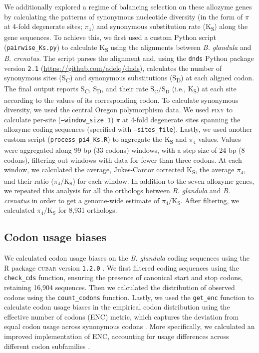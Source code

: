 \documentclass[11pt]{article}
\newcommand{\bgla}{\textit{B. glandula}\xspace}
\newcommand{\Ks}{K\textsubscript{S}\xspace}
\begin{document}
We additionally explored a regime of balancing selection on these allozyme genes by
calculating the patterns of synonymous nucleotide diversity (in the form of $\pi$ at
4-fold degenerate sites; $\pi_{4}$) and synonymous substitution rate (\Ks{}) along
the gene sequences.
To achieve this, we first used a custom Python script (\texttt{pairwise\_Ks.py}) to
calculate \Ks{} using the alignments between \bgla{} and \textit{B. crenatus}.
The script parses the alignment and, using the \texttt{dnds} Python package version
\texttt{2.1} (\url{https://github.com/adelq/dnds}), calculates the number of
synonymous sites (S\textsubscript{C}) and synonymous substitutions
(S\textsubscript{D}) at each aligned codon.
The final output reports S\textsubscript{C}, S\textsubscript{D}, and their rate
$\text{S}_\text{C}/\text{S}_\text{D}$ (i.e., \Ks{}) at each site according to the
values of its corresponding codon.
To calculate synonymous diversity, we used the central Oregon polymorphism data.
We used \textsc{pixy} to calculate per-site (\texttt{--window\_size 1}) $\pi$ at
4-fold degenerate sites spanning the allozyme coding sequences (specified with
\texttt{--sites\_file}).
Lastly, we used another custom script (\texttt{process\_pi4\_Ks.R}) to aggregate
the \Ks{} and $\pi_{4}$ values.
Values were aggregated along 99 bp (33 codons) windows, with a step size of 24 bp
(8 codons), filtering out windows with data for fewer than three codons.
At each window, we calculated the average, Jukes-Cantor corrected \Ks{}, the
average $\pi_{4}$, and their ratio ($\pi_{4}/\text{K}_\text{S}$) for each window.
In addition to the seven allozyme genes, we repeated this analysis for all the 
orthologs between \bgla{} and \textit{B. crenatus} in order to get a genome-wide
estimate of $\pi_{4}/\text{K}_\text{S}$.
After filtering, we calculated $\pi_{4}/\text{K}_\text{S}$ for 8,931 orthologs.

\subsection*{Codon usage biases}

We calculated codon usage biases on the \bgla{} coding sequences using the R package
\textsc{cubar} version \texttt{1.2.0} \citep{liu_cubar_2026}.
We first filtered coding sequences using the \texttt{check\_cds} function,
ensuring the presence of canonical start and stop codons, retaining 16,904
sequences.
Then we calculated the distribution of observed codons using the
\texttt{count\_codons} function.
Lastly, we used the \texttt{get\_enc} function to calculate codon usage biases
in the empirical codon distribution using the effective number of codons (ENC)
metric, which captures the deviation from equal codon usage across synonymous
codons \citep{wright_effective_1990}.
More specifically, we calculated an improved implementation of ENC, accounting for
usage differences across different codon subfamilies \citep{sun_improved_2013}.
\end{document}
